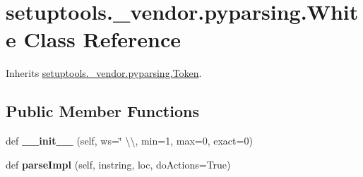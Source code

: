 \hypertarget{classsetuptools_1_1__vendor_1_1pyparsing_1_1_white}{}\section{setuptools.\+\_\+vendor.\+pyparsing.\+White Class Reference}
\label{classsetuptools_1_1__vendor_1_1pyparsing_1_1_white}


Inherits \hyperlink{classsetuptools_1_1__vendor_1_1pyparsing_1_1_token}{setuptools.\+\_\+vendor.\+pyparsing.\+Token}.

\subsection*{Public Member Functions}
\begin{DoxyCompactItemize}
\item 
\mbox{\label{classsetuptools_1_1__vendor_1_1pyparsing_1_1_white_ab4c953a9e93bac4a6e1808fd34aa3957}} 
def {\bfseries \+\_\+\+\_\+init\+\_\+\+\_\+} (self, ws=\char`\"{} \textbackslash{}\textbackslash{}, min=1, max=0, exact=0)
\item 
\mbox{\label{classsetuptools_1_1__vendor_1_1pyparsing_1_1_white_a1051ad5867aaeb8cf7a164f73819cfe0}} 
def {\bfseries parse\+Impl} (self, instring, loc, do\+Actions=True)
\end{DoxyCompactItemize}
